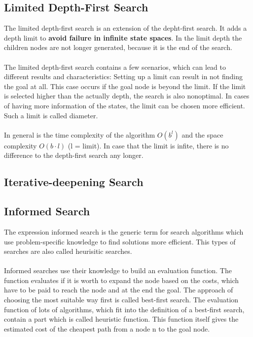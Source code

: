 \documentclass[11pt]{article}
\begin{document}
\subsection{Limited Depth-First Search}
The limited depth-first search is an extension of the depht-first search. It adds a depth limit to \textbf{avoid failure in infinite state spaces}. In the limit depth the children nodes are not longer generated, because it is the end of the search. \\
\\
The limited depth-first search contains a few scenarios, which can lead to different results and characteristics: Setting up a limit can result in not finding the goal at all. This case occurs if the goal node is beyond the limit. If the limit is selected higher than the actually depth, the search is also nonoptimal. In cases of having more information of the states, the limit can be chosen more efficient. Such a limit is called diameter.\\
\\
In general is the time complexity of the algorithm  $O(b^{l})$ and the space complexity $O(b \cdot l)$ (l = limit). In case that the limit is infite, there is no difference to the depth-first search any longer.  

\subsection{Iterative-deepening Search}

\subsection{Informed Search}
The expression informed search is the generic term for search algorithms which use problem-specific knowledge to find solutions more efficient. This types of searches are also called heurisitic searches. \\
\\
Informed searches use their knowledge to build an evaluation function. The function evaluates if it is worth to expand the node based on the costs, which have to be paid to reach the node and at the end the goal. The approach of choosing the most suitable way first is called best-first search. The evaluation function of lots of algorithms, which fit into the definition of a best-first search, contain a part which is called heuristic function. This function itself gives the estimated cost of the cheapest path from a node n to the goal node.
\end{document}
